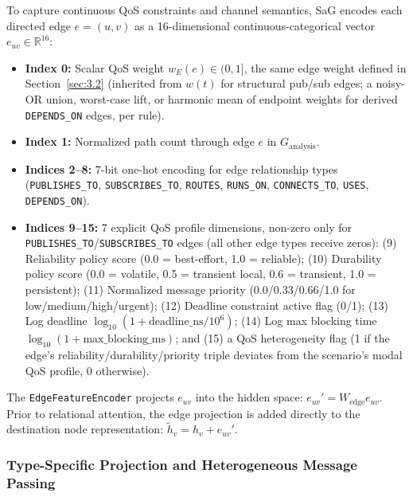 To capture continuous QoS constraints and channel semantics, SaG encodes each directed edge $e = (u, v)$ as a 16-dimensional continuous-categorical vector $e_{uv} \in \mathbb{R}^{16}$:
\begin{itemize}
    \item \textbf{Index 0:} Scalar QoS weight $w_E(e) \in (0, 1]$, the same edge weight defined in Section~\ref{sec:3.2} (inherited from $w(t)$ for structural pub/sub edges; a noisy-OR union, worst-case lift, or harmonic mean of endpoint weights for derived \texttt{DEPENDS\_ON} edges, per rule).
    \item \textbf{Index 1:} Normalized path count through edge $e$ in $G_{\text{analysis}}$.
    \item \textbf{Indices 2--8:} 7-bit one-hot encoding for edge relationship types (\texttt{PUBLISHES\_TO}, \texttt{SUBSCRIBES\_TO}, \texttt{ROUTES}, \texttt{RUNS\_ON}, \texttt{CONNECTS\_TO}, \texttt{USES}, \texttt{DEPENDS\_ON}).
    \item \textbf{Indices 9--15:} 7 explicit QoS profile dimensions, non-zero only for \texttt{PUBLISHES\_TO}/\texttt{SUBSCRIBES\_TO} edges (all other edge types receive zeros): (9) Reliability policy score (0.0 = best-effort, 1.0 = reliable); (10) Durability policy score (0.0 = volatile, 0.5 = transient local, 0.6 = transient, 1.0 = persistent); (11) Normalized message priority (0.0/0.33/0.66/1.0 for low/medium/high/urgent); (12) Deadline constraint active flag (0/1); (13) Log deadline $\log_{10}(1 + \text{deadline\_ns} / 10^6)$; (14) Log max blocking time $\log_{10}(1 + \text{max\_blocking\_ms})$; and (15) a QoS heterogeneity flag (1 if the edge's reliability/durability/priority triple deviates from the scenario's modal QoS profile, 0 otherwise).
\end{itemize}

The \texttt{EdgeFeatureEncoder} projects $e_{uv}$ into the hidden space: $e_{uv}' = W_{\text{edge}} e_{uv}$. Prior to relational attention, the edge projection is added directly to the destination node representation: $\tilde{h}_v = h_v + e_{uv}'$.

\subsubsection{Type-Specific Projection and Heterogeneous Message Passing}

